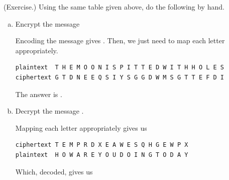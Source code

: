\documentclass[letterpaper]{article}
\newcommand{\0}{\mathbf{0}}
\begin{document}
\begin{mdframed}
    (Exercise.) Using the same table given above, do the following by hand. 

    \begin{enumerate}[(a)]
        \item Encrypt the message 
        \begin{mdframed}
            Encoding the message gives . Then, we just need to map each letter appropriately. 
            \begin{verbatim}
plaintext  T H E M O O N I S P I T T E D W I T H H O L E S
ciphertext G T D N E E Q S I Y S G G D W M S G T T E F D I\end{verbatim}
            The answer is .
        \end{mdframed}

        \item Decrypt the message .
        \begin{mdframed}
            Mapping each letter appropriately gives us
            \begin{verbatim}
ciphertext T E M P R D X E A W E S Q H G E W P X
plaintext  H O W A R E Y O U D O I N G T O D A Y\end{verbatim}
            Which, decoded, gives us 
        \end{mdframed}
    \end{enumerate}
\end{mdframed}
\end{document}
